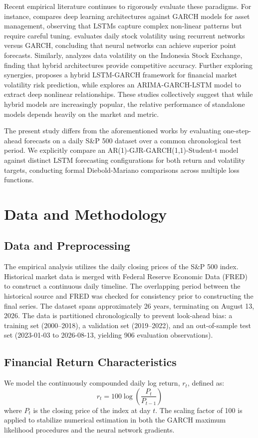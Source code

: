 \documentclass[11pt,a4paper]{article}
\begin{document}
Recent empirical literature continues to rigorously evaluate these paradigms. For instance, \cite{petrozziello2022deep} compares deep learning architectures against GARCH models for asset management, observing that LSTMs capture complex non-linear patterns but require careful tuning. \cite{cai2023forecasting} evaluates daily stock volatility using recurrent networks versus GARCH, concluding that neural networks can achieve superior point forecasts. Similarly, \cite{mualifah2024comparison} analyzes data volatility on the Indonesia Stock Exchange, finding that hybrid architectures provide competitive accuracy. Further exploring synergies, \cite{xu2024hybrid} proposes a hybrid LSTM-GARCH framework for financial market volatility risk prediction, while \cite{li2025stock} explores an ARIMA-GARCH-LSTM model to extract deep nonlinear relationships. These studies collectively suggest that while hybrid models are increasingly popular, the relative performance of standalone models depends heavily on the market and metric.

The present study differs from the aforementioned works by evaluating one-step-ahead forecasts on a daily S\&P 500 dataset over a common chronological test period. We explicitly compare an AR(1)-GJR-GARCH(1,1)-Student-t model against distinct LSTM forecasting configurations for both return and volatility targets, conducting formal Diebold-Mariano comparisons across multiple loss functions.

\section{Data and Methodology}

\subsection{Data and Preprocessing}
The empirical analysis utilizes the daily closing prices of the S\&P 500 index. Historical market data is merged with Federal Reserve Economic Data (FRED) to construct a continuous daily timeline. The overlapping period between the historical source and FRED was checked for consistency prior to constructing the final series. The dataset spans approximately 26 years, terminating on August 13, 2026. The data is partitioned chronologically to prevent look-ahead bias: a training set (2000--2018), a validation set (2019--2022), and an out-of-sample test set (2023-01-03 to 2026-08-13, yielding 906 evaluation observations). 

\subsection{Financial Return Characteristics}
We model the continuously compounded daily log return, $r_t$, defined as:
\begin{equation}
r_t = 100 \log\left(\frac{P_t}{P_{t-1}}\right)
\end{equation}
where $P_t$ is the closing price of the index at day $t$. The scaling factor of 100 is applied to stabilize numerical estimation in both the GARCH maximum likelihood procedures and the neural network gradients.
\end{document}
